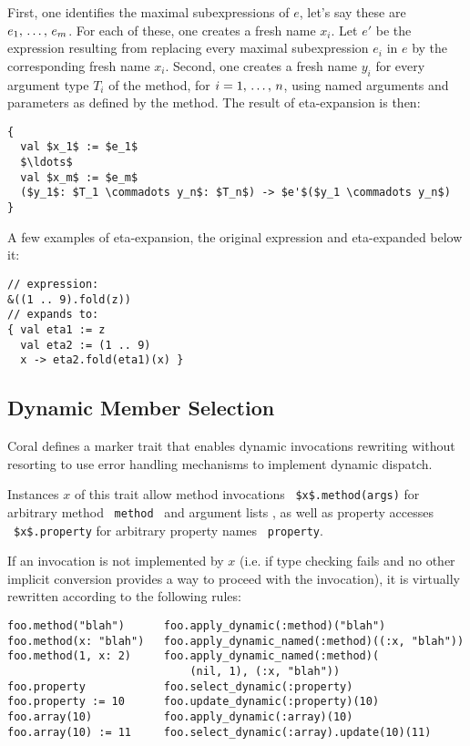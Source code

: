First, one identifies the maximal subexpressions of $e$, let's say these are $e_1 ,\, \ldots ,\, e_m$. For each of these, one creates a fresh name $x_i$. Let $e'$ be the expression resulting from replacing every maximal subexpression $e_i$ in $e$ by the corresponding fresh name $x_i$. Second, one creates a fresh name $y_i$ for every argument type $T_i$ of the method, for $i = 1 ,\, \ldots ,\, n$, using named arguments and parameters as defined by the method. The result of eta-expansion is then: 
\begin{lstlisting}
{
  val $x_1$ := $e_1$
  $\ldots$
  val $x_m$ := $e_m$
  ($y_1$: $T_1 \commadots y_n$: $T_n$) -> $e'$($y_1 \commadots y_n$)
}
\end{lstlisting}

\example A few examples of eta-expansion, the original expression and eta-expanded below it:
\begin{lstlisting}
// expression:
&((1 .. 9).fold(z))
// expands to:
{ val eta1 := z
  val eta2 := (1 .. 9)
  x -> eta2.fold(eta1)(x) }
\end{lstlisting}







\subsection{Dynamic Member Selection}
\label{sec:dynamic-member-selection}

Coral defines a marker trait  that enables dynamic invocations rewriting without resorting to use error handling mechanisms to implement dynamic dispatch. 

Instances $x$ of this trait allow method invocations ~\lstinline[deletekeywords={method}]!$x$.method(args)! for arbitrary method ~\lstinline[deletekeywords={method}]!method!~ and argument lists , as well as property accesses ~\lstinline[deletekeywords={property}]!$x$.property! for arbitrary property names ~\lstinline[deletekeywords={property}]!property!. 

If an invocation is not implemented by $x$ (i.e. if type checking fails and no other implicit conversion provides a way to proceed with the invocation), it is virtually rewritten according to the following rules:

\begin{lstlisting}[deletekeywords={property,method}]
foo.method("blah")      foo.apply_dynamic(:method)("blah")
foo.method(x: "blah")   foo.apply_dynamic_named(:method)((:x, "blah"))
foo.method(1, x: 2)     foo.apply_dynamic_named(:method)(
                            (nil, 1), (:x, "blah"))
foo.property            foo.select_dynamic(:property)
foo.property := 10      foo.update_dynamic(:property)(10)
foo.array(10)           foo.apply_dynamic(:array)(10)
foo.array(10) := 11     foo.select_dynamic(:array).update(10)(11)
\end{lstlisting}






